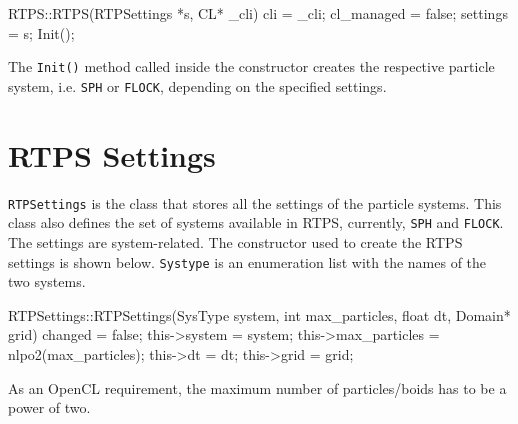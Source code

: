 
\begin{cppcode}{0}
RTPS::RTPS(RTPSettings *s, CL* _cli) 
{
	cli = _cli;
 	cl_managed = false;
	settings = s;
	Init();
}
\end{cppcode}

The \texttt{Init()} method called inside the constructor creates the respective particle system, i.e. \texttt{SPH} or \texttt{FLOCK}, depending on the specified settings.

\section{RTPS Settings}\label{rtpsettings}
\texttt{RTPSettings} is the class that stores all the settings of the particle systems. This class also defines the set of systems available in RTPS, currently,  \texttt{SPH} and \texttt{FLOCK}.  The settings are system-related. 
The constructor used to create the RTPS settings is shown below. 
\texttt{Systype} is an enumeration list with the names of the two systems. 


\begin{cppcode}{0}
RTPSettings::RTPSettings(SysType system, int max_particles, float dt, Domain* grid)
{
	changed = false;
	this->system = system;
	this->max_particles = nlpo2(max_particles);
	this->dt = dt;
	this->grid = grid;
}
\end{cppcode}

As an OpenCL requirement, the maximum number of particles/boids has to be a power of two. 

